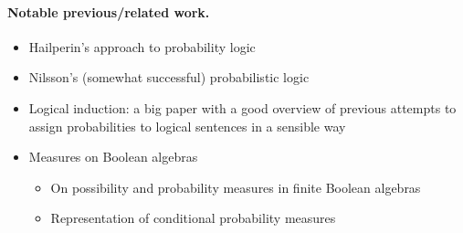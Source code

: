 \documentclass{article}
\theoremstyle{definition}
\theoremstyle{remark}
\begin{document}
\paragraph{Notable previous/related work.}
\begin{itemize}
\item Hailperin's approach to probability logic
  \cite{DBLP:journals/ndjfl/Hailperin84}
\item Nilsson's (somewhat successful) probabilistic logic
  \cite{DBLP:journals/ai/Nilsson86}
\item Logical induction: a big paper with a good overview of previous attempts
  to assign probabilities to logical sentences in a sensible way
  \cite{DBLP:journals/eccc/GarrabrantBCST16}
\item Measures on Boolean algebras
  \begin{itemize}
  \item On possibility and probability measures in finite Boolean algebras
    \cite{DBLP:journals/soco/CastineiraCT02}
  \item Representation of conditional probability measures
    \cite{krauss1968representation}
  \end{itemize}
\end{itemize}
\end{document}
